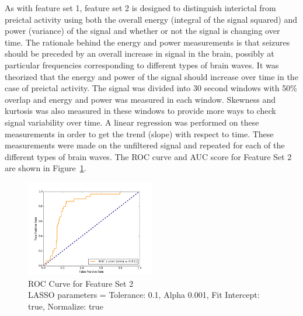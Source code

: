 \documentclass[10pt, conference, compsocconf]{IEEEtran}
\begin{document}
As with feature set 1, feature set 2 is designed to distinguish interictal from
preictal activity using both the overall energy (integral of the signal squared)
and power (variance) of the signal and whether or not the signal is changing
over time. The rationale behind the energy and power measurements is that
seizures should be preceded by an overall increase in signal in the brain,
possibly at particular frequencies corresponding to different types of brain
waves. It was theorized that the energy and power of the signal should increase
over time in the case of preictal activity. The signal was divided into 30
second windows with 50\% overlap and energy and power was measured in each
window. Skewness and kurtosis was also measured in these windows to provide more
ways to check signal variability over time. A linear regression was performed on
these measurements in order to get the trend (slope) with respect to time.
These measurements were made on the unfiltered signal and repeated for each of
the different types of brain waves. The ROC curve and AUC score for Feature Set
2 are shown in Figure~\ref{fig:ROC2}.
\begin{figure}[t]
\centering
  \includegraphics[width=0.5\textwidth]{fig/image05.png}  
    \caption{ROC Curve for Feature Set 2\\LASSO parameters = Tolerance: 0.1, Alpha 0.001, Fit Intercept:
    true, Normalize: true}
   \label{fig:ROC2}
\end{figure}
\end{document}
